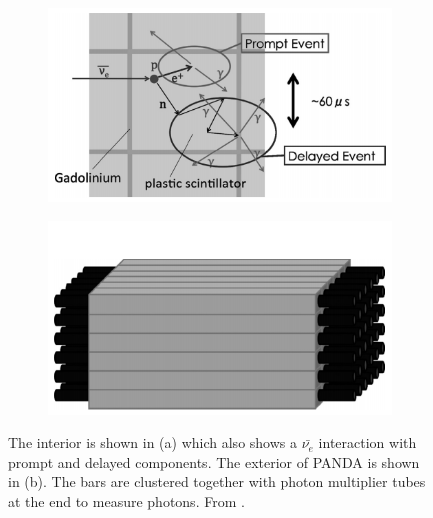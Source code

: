 \begin{figure}[!h]
\centering
\begin{subfigure}{.5\textwidth}
  \centering
\includegraphics[width=\linewidth]{Chapter2/Figs/Raster/Panda_close.png}
  \captionsetup{width=.9\linewidth}
  \caption{}
  \label{subFig:pandaClose}
\end{subfigure}%
\begin{subfigure}{.5\textwidth}
  \centering
  \includegraphics[width=\linewidth]{Chapter2/Figs/Raster/Panda_far.png}
  \captionsetup{width=.9\linewidth}
  \caption{}
  \label{subFig:pandaFar}
\end{subfigure}
\caption{The interior is shown in (a) which also shows a  $\bar{\nu_e}$ interaction with prompt and delayed components. The exterior of PANDA is shown in (b). The bars are clustered together with photon multiplier tubes at the end to measure photons. From \cite{PANDA_2014}.}
\label{fig:pandaCloseFar}
\end{figure}

